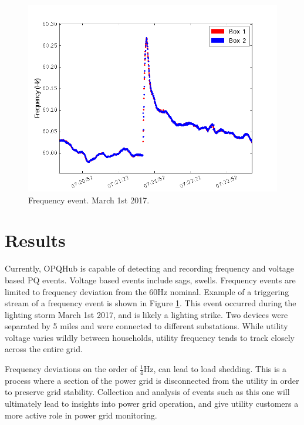 \documentclass[a4paper, conference]{IEEEtran}
\begin{document}
\begin{figure}[h]
    \centering
    \includegraphics[width=0.9\columnwidth]{img/Event1_f.png}
    \caption{Frequency event. March 1st 2017.}
    \label{fig:event}
\end{figure}

\section{Results}

Currently, OPQHub is capable of detecting and recording frequency and 
voltage based PQ events. Voltage based events include sags, swells.
Frequency events are limited to frequency deviation from the 60Hz nominal. Example of a triggering stream of a frequency event is shown in Figure \ref{fig:event}. This event occurred during the lighting storm March 1st 2017, and is likely a lighting strike. Two devices were separated by 5 miles and were connected to different substations. 
While utility voltage varies wildly between households, utility frequency tends to track closely across the entire grid. 

Frequency deviations on the order of $\frac{1}{4}$Hz, can lead to load shedding\cite{GE_LS}. This is a process where a section of the power grid is disconnected from the utility in order to preserve grid stability. Collection and analysis of events such as this one will ultimately lead to insights into power grid operation, and give utility customers a more active role in power grid monitoring.

%
\end{document}
